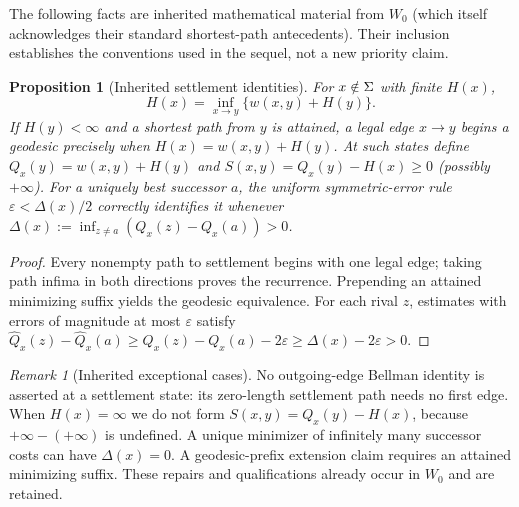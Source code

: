 \documentclass[11pt]{article}
\newtheorem{proposition}[theorem]{Proposition}
\theoremstyle{definition}\newtheorem{definition}[theorem]{Definition}\newtheorem{assumption}[theorem]{Assumption}
\theoremstyle{remark}\newtheorem{remark}[theorem]{Remark}
\begin{document}
The following facts are inherited mathematical material from $W_0$ (which itself acknowledges their standard shortest-path antecedents). Their inclusion establishes the conventions used in the sequel, not a new priority claim.
\begin{proposition}[Inherited settlement identities]\label{prop:inherit}
For $x\notin\Sigma$ with finite $H(x)$,
\[
H(x)=\inf_{x\to y}\{w(x,y)+H(y)\}.
\]
If $H(y)<\infty$ and a shortest path from $y$ is attained, a legal edge $x\to y$ begins a geodesic precisely when $H(x)=w(x,y)+H(y)$. At such states define $Q_x(y)=w(x,y)+H(y)$ and $S(x,y)=Q_x(y)-H(x)\geq0$ (possibly $+\infty$). For a uniquely best successor $a$, the uniform symmetric-error rule $\varepsilon<\Delta(x)/2$ correctly identifies it whenever $\Delta(x):=\inf_{z\neq a}(Q_x(z)-Q_x(a))>0$.
\end{proposition}
\begin{proof}
Every nonempty path to settlement begins with one legal edge; taking path infima in both directions proves the recurrence. Prepending an attained minimizing suffix yields the geodesic equivalence. For each rival $z$, estimates with errors of magnitude at most $\varepsilon$ satisfy $\widehat Q_x(z)-\widehat Q_x(a)\geq Q_x(z)-Q_x(a)-2\varepsilon\geq\Delta(x)-2\varepsilon>0$.
\end{proof}
\par


\begin{remark}[Inherited exceptional cases]\label{rem:bounds}
No outgoing-edge Bellman identity is asserted at a settlement state: its zero-length settlement path needs no first edge. When $H(x)=\infty$ we do not form $S(x,y)=Q_x(y)-H(x)$, because $+\infty-(+\infty)$ is undefined. A unique minimizer of infinitely many successor costs can have $\Delta(x)=0$. A geodesic-prefix extension claim requires an attained minimizing suffix. These repairs and qualifications already occur in $W_0$ and are retained.
\end{remark}
\end{document}
